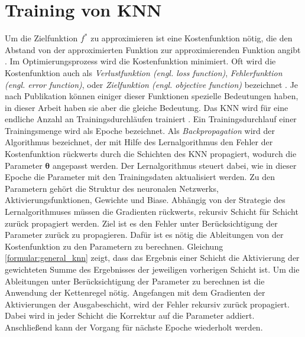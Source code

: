 \section{Training von KNN}
Um die Zielfunktion $f^{*}$ zu approximieren ist eine Kostenfunktion nötig, die den Abstand von der approximierten Funktion zur approximierenden Funktion angibt \cite{nielsenneural}.
Im Optimierungsprozess wird die Kostenfunktion minimiert. 
Oft wird die Kostenfunktion auch als \textit{Verlustfunktion (engl. loss function)}, \textit{Fehlerfunktion (engl. error function)},
oder \textit{Zielfunktion (engl. objective function)} bezeichnet \cite{bengio2017deep}.
Je nach Publikation können einiger dieser Funktionen spezielle Bedeutungen haben, in dieser Arbeit haben sie aber die gleiche Bedeutung.
\newline
\newline
Das KNN wird für eine endliche Anzahl an Trainingsdurchläufen trainiert \cite{nielsenneural}.
Ein Trainingsdurchlauf einer Trainingsmenge wird als Epoche bezeichnet.
Als \textit{Backpropagation} wird der Algorithmus bezeichnet, der mit Hilfe des Lernalgorithmus den Fehler der
Kostenfunktion rückwerts durch die Schichten des KNN propagiert, wodurch die Parameter $\boldsymbol\theta$ angepasst werden.
Der Lernalgorithmus steuert dabei, wie in dieser Epoche die Parameter mit den Trainingsdaten aktualisiert werden.
Zu den Parametern gehört die Struktur des neuronalen Netzwerks, Aktivierungsfunktionen, Gewichte und Biase.
\newline
\newline
Abhängig von der Strategie des Lernalgorithmuses müssen die Gradienten rückwerts, rekursiv Schicht für Schicht zurück propagiert werden.
Ziel ist es den Fehler unter Berücksichtigung der Parameter zurück zu propagieren.
Dafür ist es nötig die Ableitungen von der Kostenfunktion zu den Parametern zu berechnen.
Gleichung \ref{formular:general_knn} zeigt, dass das Ergebnis einer Schicht die Aktivierung der gewichteten Summe des
Ergebnisses der jeweiligen vorherigen Schicht ist.
Um die Ableitungen unter Berücksichtigung der Parameter zu berechnen ist die Anwendung der Kettenregel nötig.
\newline
\newline
Angefangen mit dem Gradienten der Aktivierungen der Ausgabeschicht, wird der Fehler rekursiv zurück propagiert.
Dabei wird in jeder Schicht die Korrektur auf die Parameter addiert.
Anschließend kann der Vorgang für nächste Epoche wiederholt werden.